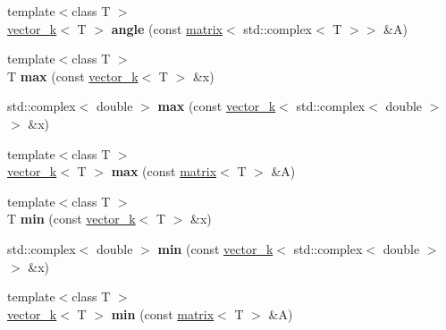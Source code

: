 \begin{DoxyCompactItemize}
\item 
\hypertarget{namespacekeycpp_a05899b620c8859f8832ad3132efce6b8}{{\footnotesize template$<$class T $>$ }\\\hyperlink{classkeycpp_1_1vector__k}{vector\-\_\-k}$<$ T $>$ {\bfseries angle} (const \hyperlink{classkeycpp_1_1matrix}{matrix}$<$ std\-::complex$<$ T $>$$>$ \&A)}\label{namespacekeycpp_a05899b620c8859f8832ad3132efce6b8}

\item 
\hypertarget{namespacekeycpp_a5a9aef54bbe0cd6e85d9a41842a57f05}{{\footnotesize template$<$class T $>$ }\\T {\bfseries max} (const \hyperlink{classkeycpp_1_1vector__k}{vector\-\_\-k}$<$ T $>$ \&x)}\label{namespacekeycpp_a5a9aef54bbe0cd6e85d9a41842a57f05}

\item 
\hypertarget{namespacekeycpp_a61e3069eeec7219d10f997367701e488}{std\-::complex$<$ double $>$ {\bfseries max} (const \hyperlink{classkeycpp_1_1vector__k}{vector\-\_\-k}$<$ std\-::complex$<$ double $>$ $>$ \&x)}\label{namespacekeycpp_a61e3069eeec7219d10f997367701e488}

\item 
\hypertarget{namespacekeycpp_a9d09b9019cc0bd9ad23b814e8a50fe25}{{\footnotesize template$<$class T $>$ }\\\hyperlink{classkeycpp_1_1vector__k}{vector\-\_\-k}$<$ T $>$ {\bfseries max} (const \hyperlink{classkeycpp_1_1matrix}{matrix}$<$ T $>$ \&A)}\label{namespacekeycpp_a9d09b9019cc0bd9ad23b814e8a50fe25}

\item 
\hypertarget{namespacekeycpp_a3f6e11da7ff0d018261f1d66703672af}{{\footnotesize template$<$class T $>$ }\\T {\bfseries min} (const \hyperlink{classkeycpp_1_1vector__k}{vector\-\_\-k}$<$ T $>$ \&x)}\label{namespacekeycpp_a3f6e11da7ff0d018261f1d66703672af}

\item 
\hypertarget{namespacekeycpp_aa56d65d68004f40352c8e33bffb0e0eb}{std\-::complex$<$ double $>$ {\bfseries min} (const \hyperlink{classkeycpp_1_1vector__k}{vector\-\_\-k}$<$ std\-::complex$<$ double $>$ $>$ \&x)}\label{namespacekeycpp_aa56d65d68004f40352c8e33bffb0e0eb}

\item 
\hypertarget{namespacekeycpp_a51bbe7de3141b751cc3ce36cdfb51000}{{\footnotesize template$<$class T $>$ }\\\hyperlink{classkeycpp_1_1vector__k}{vector\-\_\-k}$<$ T $>$ {\bfseries min} (const \hyperlink{classkeycpp_1_1matrix}{matrix}$<$ T $>$ \&A)}\label{namespacekeycpp_a51bbe7de3141b751cc3ce36cdfb51000}


\end{DoxyCompactItemize}
